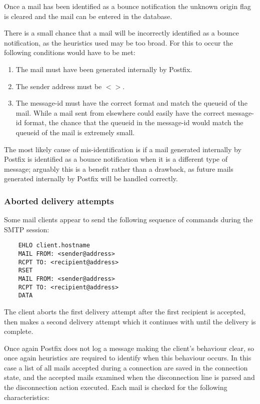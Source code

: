 \documentclass[a4paper,12pt,draft]{article}
\begin{document}
Once a mail has been identified as a bounce notification the unknown origin
flag is cleared and the mail can be entered in the database.

There is a small chance that a mail will be incorrectly identified as a
bounce notification, as the heuristics used may be too broad.  For this to
occur the following conditions would have to be met:

\begin{enumerate}

    \item The mail must have been generated internally by Postfix.

    \item The sender address must be $<>$.

    \item The message-id must have the correct format and match the queueid
        of the mail.  While a mail sent from elsewhere could easily have
        the correct message-id format, the chance that the queueid in the
        message-id would match the queueid of the mail is extremely small.

\end{enumerate}

The most likely cause of mis-identification is if a mail generated
internally by Postfix is identified as a bounce notification when it is a
different type of message; arguably this is a benefit rather than a
drawback, as future mails generated internally by Postfix will be handled
correctly.

\subsubsection{Aborted delivery attempts}

\label{aborted-delivery-attempts}

Some mail clients appear to send the following sequence of commands during
the SMTP session:

\begin{verbatim}
    EHLO client.hostname
    MAIL FROM: <sender@address>
    RCPT TO: <recipient@address>
    RSET
    MAIL FROM: <sender@address>
    RCPT TO: <recipient@address>
    DATA
\end{verbatim}

The client aborts the first delivery attempt after the first recipient is
accepted, then makes a second delivery attempt which it continues with
until the delivery is complete.

Once again Postfix does not log a message making the client's behaviour
clear, so once again heuristics are required to identify when this
behaviour occurs.  In this case a list of all mails accepted during a
connection are saved in the connection state, and the accepted mails
examined when the disconnection line is parsed and the disconnection action
executed.  Each mail is checked for the following characteristics:
\end{document}
